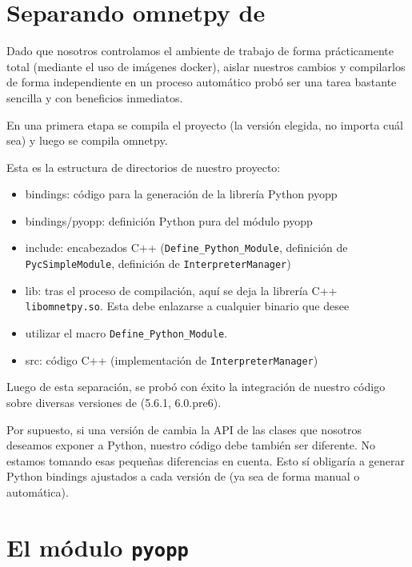 \section{Separando omnetpy de \omnetpp{}}

Dado que nosotros controlamos el ambiente de trabajo de forma prácticamente
total (mediante el uso de imágenes docker), aislar nuestros cambios y
compilarlos de forma independiente en un proceso automático probó ser una tarea
bastante sencilla y con beneficios inmediatos.

En una primera etapa se compila el proyecto \omnetpp{} (la versión elegida, no
importa cuál sea) y luego se compila omnetpy.

Esta es la estructura de directorios de nuestro proyecto:

\begin{itemize}
    \item bindings: código para la generación de la librería Python pyopp

    \item bindings/pyopp: definición Python pura del módulo pyopp

    \item include: encabezados C++ (\verb!Define_Python_Module!, definición de
\verb!PycSimpleModule!, definición de \verb!InterpreterManager!)

    \item lib: tras el proceso de compilación, aquí se deja la librería C++
\verb!libomnetpy.so!. Esta debe enlazarse a cualquier binario que desee
    \item utilizar el macro \verb!Define_Python_Module!.

    \item src: código C++ (implementación de \verb!InterpreterManager!)
\end{itemize}

Luego de esta separación, se probó con éxito la integración de nuestro código
sobre diversas versiones de \omnetpp{} (5.6.1, 6.0.pre6).

Por supuesto, si una versión de \omnetpp{} cambia la API de las clases que
nosotros deseamos exponer a Python, nuestro código debe también ser diferente.
No estamos tomando esas pequeñas diferencias en cuenta. Esto sí obligaría a
generar Python bindings ajustados a cada versión de \omnetpp{} (ya sea de forma
manual o automática).

\section{El módulo \texttt{pyopp}}

